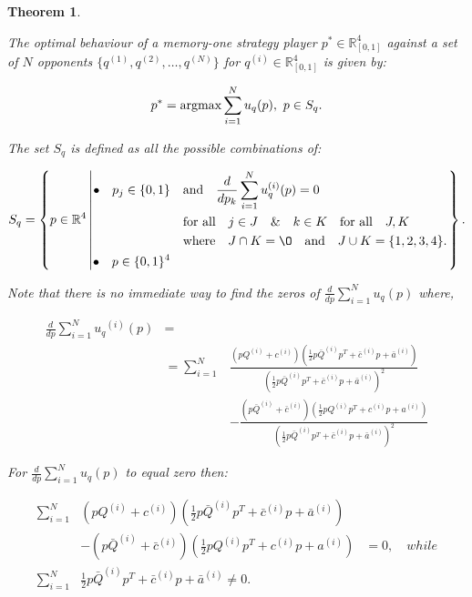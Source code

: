 \documentclass[9pt,twocolumn,twoside,lineno]{pnas-new}
\newcommand{\R}{\mathbb{R}}
\newtheorem{theorem}{Theorem}
\begin{document}
\begin{theorem}\label{memone_group_best_response}

The optimal behaviour of a memory-one strategy player
\(p^* \in \R_{[0, 1]} ^ 4\)
against a set of \(N\) opponents \(\{q^{(1)}, q^{(2)}, \dots, q^{(N)} \}\)
for \(q^{(i)} \in \R_{[0, 1]} ^ 4\) is given by:

\[p^* = \textnormal{argmax}\sum\limits_{i=1} ^ N  u_q(p), \ p \in S_q.\]

The set \(S_q\) is defined as all the possible combinations of:

{\tiny
\begin{equation}\label{eq:s_q_set}
    S_q =
    \left\{p \in \mathbb{R} ^ 4 \left|
        \begin{aligned}
            \bullet\quad p_j \in \{0, 1\} & \quad \text{and} \quad \frac{d}{dp_k} 
            \sum\limits_{i=1} ^ N  u_q^{(i)}(p) = 0 \\
            & \quad \text{for all} \quad j \in J \quad \&  \quad k \in K  \quad \text{for all} \quad J, K \\
            & \quad \text{where} \quad J \cap K = \O \quad
            \text{and} \quad J \cup K = \{1, 2, 3, 4\}.\\
            \bullet\quad  p \in \{0, 1\} ^ 4
        \end{aligned}\right.
    \right\}.
\end{equation}
}

Note that there is no immediate way to find the zeros of
\(\frac{d}{dp} \sum\limits_{i=1} ^ N  u_q(p)\) where,

{\tiny
\begin{align}\label{eq:mo_tournament_derivative}
    \frac{d}{dp} \sum\limits_{i=1} ^ {N} {u_q}^{(i)} (p) & = \nonumber \\
    & = \displaystyle\sum\limits_{i=1} ^ {N} & 
    \frac{\left(pQ^{(i)} + c^{(i)}\right) \left(\frac{1}{2} p\bar{Q}^{(i)} p^T + \bar{c}^{(i)} p + \bar{a}^ {(i)}\right)}
    {\left(\frac{1}{2} p\bar{Q}^{(i)} p^T + \bar{c}^{(i)} p + \bar{a}^ {(i)}\right)^ 2} \nonumber \\ 
     & & - \frac{\left(p\bar{Q}^{(i)} + \bar{c}^{(i)}\right) \left(\frac{1}{2} pQ^{(i)} p^T + c^{(i)} p + a^ {(i)}\right)}
    {\left(\frac{1}{2} p\bar{Q}^{(i)} p^T + \bar{c}^{(i)} p + \bar{a}^ {(i)}\right)^ 2}
\end{align}
}

For \(\frac{d}{dp} \sum\limits_{i=1} ^ N  u_q(p)\) to equal zero then:

{\scriptsize
\begin{align}\label{eq:polynomials_roots}
    \displaystyle\sum\limits_{i=1} ^ {N}
    & \left(pQ^{(i)} + c^{(i)}\right) \left(\frac{1}{2} p\bar{Q}^{(i)} p^T + \bar{c}^{(i)} p + \bar{a}^ {(i)}\right) \\
    & - \left(p\bar{Q}^{(i)} + \bar{c}^{(i)}\right) \left(\frac{1}{2} pQ^{(i)} p^T + c^{(i)} p + a^ {(i)}\right)
    &= 0, \quad {while} \\
    \displaystyle\sum\limits_{i=1} ^ {N} & \frac{1}{2} p\bar{Q}^{(i)} p^T + \bar{c}^{(i)} p + \bar{a}^ {(i)} \neq 0.
\end{align}}

\end{theorem}
\end{document}
